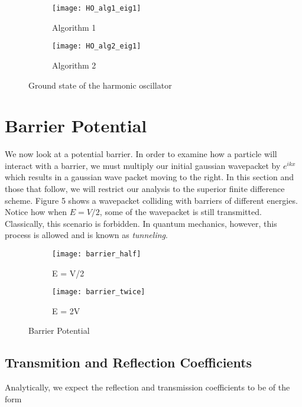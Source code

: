 \documentclass{article}
\begin{document}
\begin{figure}
\centering
\begin{subfigure}[h!]{0.3\textwidth}
\centering
\texttt{[image: HO\_alg1\_eig1]}
\caption{Algorithm 1}
\end{subfigure}
%
\begin{subfigure}[h!]{0.3\textwidth}
\centering
\texttt{[image: HO\_alg2\_eig1]}
\caption{Algorithm 2}
\end{subfigure}

\caption{Ground state of the harmonic oscillator}
\end{figure}

\section{Barrier Potential}

We now look at a potential barrier. In order to examine how a particle will interact with a barrier, we must multiply our initial gaussian wavepacket 
by $e^{ikx}$ which results in a gaussian wave packet moving to the right. In this section and those that follow, we will restrict our analysis to the superior finite difference scheme. Figure 5 shows a wavepacket colliding with barriers of different energies. Notice how when $ E = V/2 $, some of the wavepacket is still transmitted. Classically, this scenario is forbidden. In quantum mechanics, however, this process is allowed and is known as {\it tunneling}. 


\begin{figure}
\centering
\begin{subfigure}[h!]{0.3\textwidth}
\centering
\texttt{[image: barrier\_half]}
\caption{E = V/2}
\end{subfigure}
%
\begin{subfigure}[h!]{0.3\textwidth}
\centering
\texttt{[image: barrier\_twice]}
\caption{E = 2V}
\end{subfigure}

\caption{Barrier Potential}
\end{figure}


\subsection{Transmition and Reflection Coefficients}

Analytically, we expect the reflection and transmission coefficients to be of the form
\end{document}
